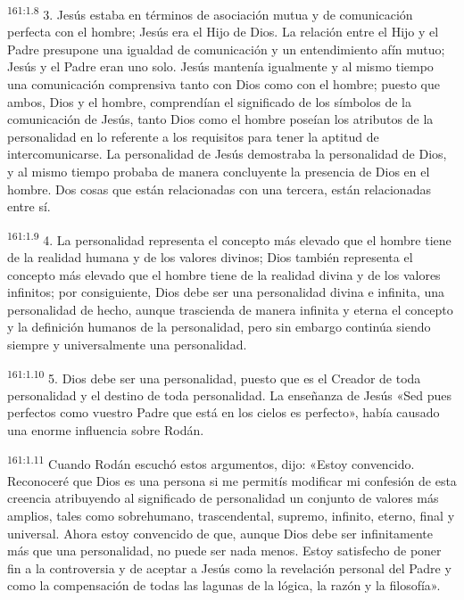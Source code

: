 \par 
\textsuperscript{161:1.8} 3. Jesús estaba en términos de asociación mutua y de comunicación perfecta con el hombre; Jesús era el Hijo de Dios. La relación entre el Hijo y el Padre presupone una igualdad de comunicación y un entendimiento afín mutuo; Jesús y el Padre eran uno solo. Jesús mantenía igualmente y al mismo tiempo una comunicación comprensiva tanto con Dios como con el hombre; puesto que ambos, Dios y el hombre, comprendían el significado de los símbolos de la comunicación de Jesús, tanto Dios como el hombre poseían los atributos de la personalidad en lo referente a los requisitos para tener la aptitud de intercomunicarse. La personalidad de Jesús demostraba la personalidad de Dios, y al mismo tiempo probaba de manera concluyente la presencia de Dios en el hombre. Dos cosas que están relacionadas con una tercera, están relacionadas entre sí.

\par 
\textsuperscript{161:1.9} 4. La personalidad representa el concepto más elevado que el hombre tiene de la realidad humana y de los valores divinos; Dios también representa el concepto más elevado que el hombre tiene de la realidad divina y de los valores infinitos; por consiguiente, Dios debe ser una personalidad divina e infinita, una personalidad de hecho, aunque trascienda de manera infinita y eterna el concepto y la definición humanos de la personalidad, pero sin embargo continúa siendo siempre y universalmente una personalidad.

\par 
\textsuperscript{161:1.10} 5. Dios debe ser una personalidad, puesto que es el Creador de toda personalidad y el destino de toda personalidad. La enseñanza de Jesús «Sed pues perfectos como vuestro Padre que está en los cielos es perfecto», había causado una enorme influencia sobre Rodán.

\par 
\textsuperscript{161:1.11} Cuando Rodán escuchó estos argumentos, dijo: «Estoy convencido. Reconoceré que Dios es una persona si me permitís modificar mi confesión de esta creencia atribuyendo al significado de personalidad un conjunto de valores más amplios, tales como sobrehumano, trascendental, supremo, infinito, eterno, final y universal. Ahora estoy convencido de que, aunque Dios debe ser infinitamente más que una personalidad, no puede ser nada menos. Estoy satisfecho de poner fin a la controversia y de aceptar a Jesús como la revelación personal del Padre y como la compensación de todas las lagunas de la lógica, la razón y la filosofía».

